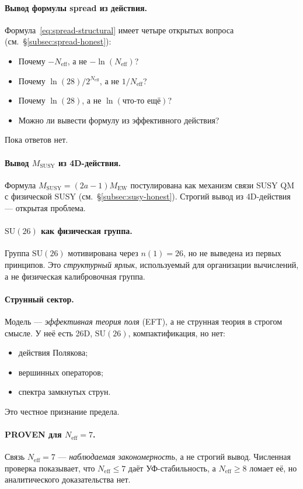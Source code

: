 \documentclass[11pt,a4paper]{article}
\newcommand{\SU}{\ensuremath{\mathrm{SU}}}
\newcommand{\Neff}{\ensuremath{N_{\text{eff}}}}
\theoremstyle{definition}
\begin{document}
\paragraph{Вывод формулы spread из действия.}
Формула~\eqref{eq:spread-structural} имеет четыре
открытых вопроса (см.~\S\ref{subsec:spread-honest}):
\begin{itemize}
    \item Почему $-\Neff$, а не $-\ln(\Neff)$?
    \item Почему $\ln(28)/2^{\Neff}$, а не $1/\Neff$?
    \item Почему $\ln(28)$, а не $\ln(\text{что-то ещё})$?
    \item Можно ли вывести формулу из эффективного действия?
\end{itemize}
Пока ответов нет.

\paragraph{Вывод $M_{\text{SUSY}}$ из 4D-действия.}
Формула $M_{\text{SUSY}} = (2a-1) M_{\text{EW}}$ постулирована
как механизм связи SUSY QM с физической SUSY
(см.~\S\ref{subsec:susy-honest}). Строгий вывод из 4D-действия
--- открытая проблема.

\paragraph{\texorpdfstring{$\SU(26)$}{(26)} как физическая группа.}
Группа $\SU(26)$ мотивирована через $n(1) = 26$, но не выведена
из первых принципов. Это \emph{структурный ярлык}, используемый
для организации вычислений, а не физическая калибровочная группа.

\paragraph{Струнный сектор.}
Модель --- \emph{эффективная теория поля} (EFT), а не струнная
теория в строгом смысле. У неё есть 26D, $\SU(26)$,
компактификация, но нет:
\begin{itemize}
    \item действия Полякова;
    \item вершинных операторов;
    \item спектра замкнутых струн.
\end{itemize}
Это честное признание предела.

\paragraph{PROVEN для $N_{\text{eff}} = 7$.}
Связь $N_{\text{eff}} = 7$ --- \emph{наблюдаемая закономерность},
а не строгий вывод. Численная проверка показывает, что
$N_{\text{eff}} \le 7$ даёт УФ-стабильность, а $N_{\text{eff}} \ge 8$
ломает её, но аналитического доказательства нет.
\end{document}
